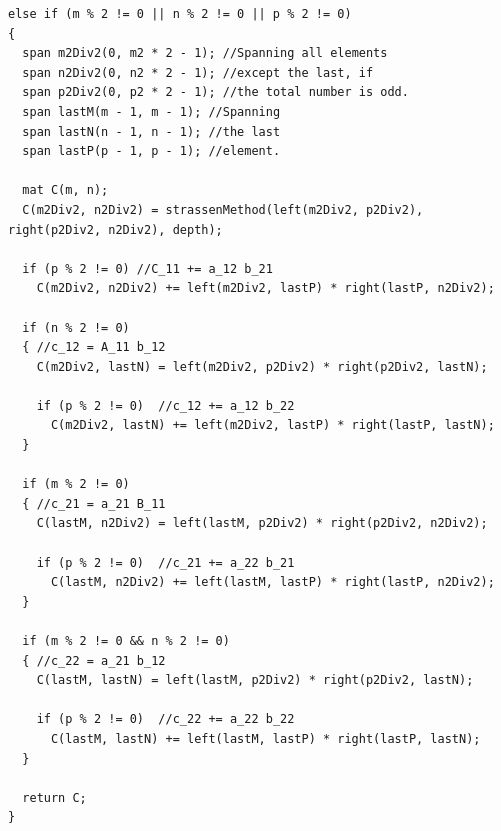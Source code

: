 \begin{lstlisting}[float,label={lst:OpenCL:Strassen_p2},caption={Implementation of Strassen's method. Continuation of listing~\ref{lst:OpenCL:Strassen_p1} and continued in listing~\ref{lst:OpenCL:Strassen_p2}.},name={strassen_complete}]
else if (m % 2 != 0 || n % 2 != 0 || p % 2 != 0) 
{
  span m2Div2(0, m2 * 2 - 1); //Spanning all elements
  span n2Div2(0, n2 * 2 - 1); //except the last, if
  span p2Div2(0, p2 * 2 - 1); //the total number is odd.
  span lastM(m - 1, m - 1); //Spanning 
  span lastN(n - 1, n - 1); //the last
  span lastP(p - 1, p - 1); //element.

  mat C(m, n);
  C(m2Div2, n2Div2) = strassenMethod(left(m2Div2, p2Div2), right(p2Div2, n2Div2), depth);

  if (p % 2 != 0) //C_11 += a_12 b_21
    C(m2Div2, n2Div2) += left(m2Div2, lastP) * right(lastP, n2Div2);

  if (n % 2 != 0)
  {	//c_12 = A_11 b_12
    C(m2Div2, lastN) = left(m2Div2, p2Div2) * right(p2Div2, lastN);

    if (p % 2 != 0)  //c_12 += a_12 b_22
      C(m2Div2, lastN) += left(m2Div2, lastP) * right(lastP, lastN);        
  }

  if (m % 2 != 0)
  {	//c_21 = a_21 B_11
    C(lastM, n2Div2) = left(lastM, p2Div2) * right(p2Div2, n2Div2);

    if (p % 2 != 0)  //c_21 += a_22 b_21
      C(lastM, n2Div2) += left(lastM, lastP) * right(lastP, n2Div2);
  }

  if (m % 2 != 0 && n % 2 != 0)
  {	//c_22 = a_21 b_12
    C(lastM, lastN) = left(lastM, p2Div2) * right(p2Div2, lastN);

    if (p % 2 != 0)  //c_22 += a_22 b_22
      C(lastM, lastN) += left(lastM, lastP) * right(lastP, lastN);
  }

  return C;
}
\end{lstlisting}






